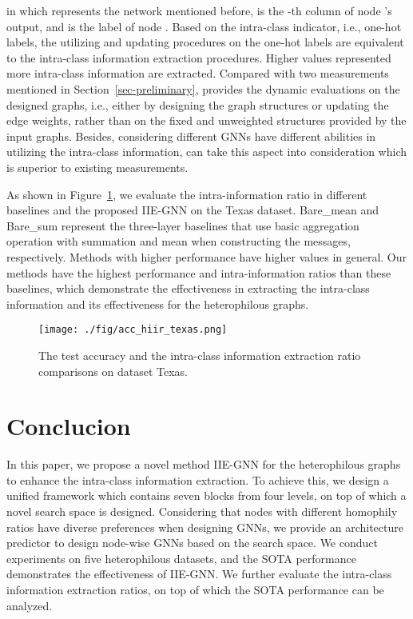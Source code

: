 \documentclass[sigconf]{acmart}
\begin{document}
in which  represents the network mentioned before,  is the -th column of node 's output, and  is the label of node . 
Based on the intra-class indicator, i.e., one-hot labels, the utilizing and updating procedures on the one-hot labels are equivalent to the intra-class information extraction procedures.
Higher  values represented more intra-class information are extracted.
Compared with two measurements mentioned in Section~\ref{sec-preliminary},  provides the dynamic evaluations on the designed graphs, i.e., either by designing the graph structures or updating the edge weights, rather than on the fixed and unweighted structures provided by the input graphs. 
Besides, considering different GNNs have different abilities in utilizing the intra-class information,  can take this aspect into consideration which is superior to existing measurements.

As shown in Figure~\ref{fig-acc-hiir}, we evaluate the intra-information ratio in different baselines and the proposed IIE-GNN on the Texas dataset. Bare\_mean and Bare\_sum represent the three-layer baselines that use basic aggregation operation with summation and mean when constructing the messages, respectively.
Methods with higher performance have higher  values in general. 
Our methods have the highest performance and intra-information ratios than these baselines, which demonstrate the effectiveness in extracting the intra-class information and its effectiveness for the heterophilous graphs. 



\begin{figure}
	\centering
	\texttt{[image: ./fig/acc\_hiir\_texas.png]}
	\caption{The test accuracy and the intra-class information extraction ratio  comparisons on dataset Texas. }
	\label{fig-acc-hiir}
\end{figure}




\section{Conclucion}
In this paper, we propose a novel method IIE-GNN for the heterophilous graphs to enhance the intra-class information extraction. To achieve this, we design a unified framework which contains seven blocks from four levels, on top of which a novel search space is designed. Considering that nodes with different homophily ratios have diverse preferences when designing GNNs, we provide an architecture predictor to design node-wise GNNs based on the search space. We conduct experiments on five heterophilous datasets, and the SOTA performance demonstrates the effectiveness of IIE-GNN. We further evaluate the intra-class information extraction ratios, on top of which the SOTA performance can be analyzed.




\end{document}
